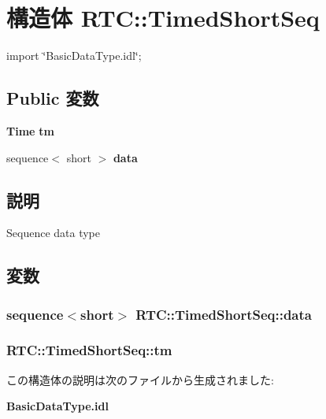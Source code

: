 \section{構造体 RTC::TimedShortSeq}
\label{structRTC_1_1TimedShortSeq}


{\ttfamily import \char`\"{}BasicDataType.idl\char`\"{};}

\subsection*{Public 変数}
\begin{DoxyCompactItemize}
\item 
{\bf Time} {\bf tm}
\item 
sequence$<$ short $>$ {\bf data}
\end{DoxyCompactItemize}


\subsection{説明}
Sequence data type 

\subsection{変数}
\subsubsection[{data}]{\setlength{\rightskip}{0pt plus 5cm}sequence$<$short$>$ {\bf RTC::TimedShortSeq::data}}\label{structRTC_1_1TimedShortSeq_a2bda3791a0078670c6850599b7f241c8}
\subsubsection[{tm}]{ {\bf RTC::TimedShortSeq::tm}}\label{structRTC_1_1TimedShortSeq_a3485de1d082d6e35350e11fb13820d27}


この構造体の説明は次のファイルから生成されました:\begin{DoxyCompactItemize}
\item 
{\bf BasicDataType.idl}\end{DoxyCompactItemize}
